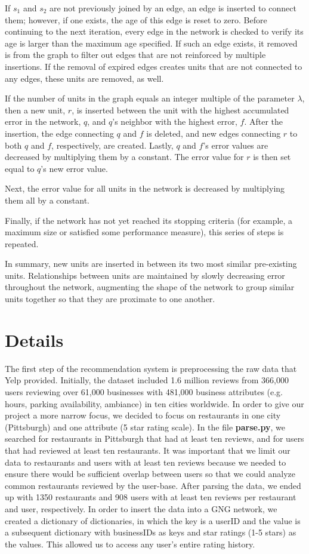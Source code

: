 \documentclass[12pt,letterpaper]{article}
\begin{document}
If $s_1$ and $s_2$ are not previously joined by an edge, an edge is inserted to connect them; however, if one exists, the age of this edge is reset to zero. Before continuing to the next iteration, every edge in the network is checked to verify its age is larger than the maximum age specified. If such an edge exists, it removed is from the graph to filter out edges that are not reinforced by multiple insertions. If the removal of expired edges creates units that are not connected to any edges, these units are removed, as well.

If the number of units in the graph equals an integer multiple of the parameter $\lambda$, then a new unit, $r$, is inserted between the unit with the highest accumulated error in the network, $q$,  and $q$'s neighbor with the highest error, $f$. After the insertion, the edge connecting $q$ and $f$ is deleted, and new edges connecting $r$ to both $q$ and $f$, respectively, are created. Lastly, $q$ and $f$'s error values are decreased by multiplying them by a constant. The error value for $r$ is then set equal to $q$'s new error value. 

Next, the error value for all units in the network is decreased by multiplying them all by a constant. 

Finally, if the network has not yet reached its stopping criteria (for example, a maximum size or satisfied some performance measure), this series of steps is repeated.

In summary, new units are inserted in between its two most similar pre-existing units. Relationships between units are maintained by slowly decreasing error throughout the network, augmenting the shape of the network to group similar units together so that they are proximate to one another.

\section{Details}

The first step of the recommendation system is preprocessing the raw data that Yelp provided. Initially, the dataset included 1.6 million reviews from 366,000 users reviewing over 61,000 businesses with 481,000 business attributes (e.g. hours, parking availability, ambiance) in ten cities worldwide. In order to give our project a more narrow focus, we decided to focus on restaurants in one city (Pittsburgh) and one attribute (5 star rating scale). In the file \textbf{parse.py}, we searched for restaurants in Pittsburgh that had at least ten reviews, and for users that had reviewed at least ten restaurants. It was important that we limit our data to restaurants and users with at least ten reviews because we needed to ensure there would be sufficient overlap between users so that we could analyze common restaurants reviewed by the user-base. After parsing the data, we ended up with 1350 restaurants and 908 users with at least ten reviews per restaurant and user, respectively. In order to insert the data into a GNG network, we created a dictionary of dictionaries, in which the key is a userID and the value is a subsequent dictionary with businessIDs as keys and star ratings (1-5 stars) as the values. This allowed us to access any user's entire rating history. 
\end{document}
